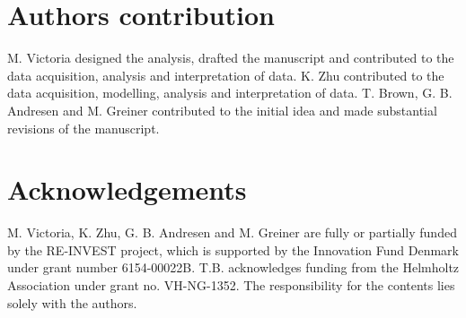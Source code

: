 \documentclass[5p]{elsarticle} %
\begin{document}
\section{Authors contribution}

M. Victoria designed the analysis, drafted the manuscript and contributed to the data acquisition, analysis and interpretation of data. K. Zhu contributed to the data acquisition, modelling, analysis and interpretation of data. 
T. Brown, G. B. Andresen and M. Greiner contributed to the initial idea and made substantial revisions of the manuscript. 

\section{Acknowledgements}
M. Victoria, K. Zhu, G. B. Andresen and M. Greiner are fully or partially funded by the RE-INVEST project, which is supported by  the  Innovation  Fund  Denmark  under  grant  number  6154-00022B. T.B. acknowledges funding from the Helmholtz Association under grant no. VH-NG-1352. The responsibility for the contents lies solely with the authors.


\end{document}
